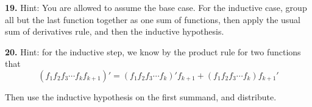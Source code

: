 \documentclass[10pt,]{book}
\theoremstyle{plain}
\theoremstyle{definition}
\theoremstyle{definition}
\theoremstyle{definition}
\numberwithin{equation}{chapter}
\begin{document}
\par\smallskip
\noindent\textbf{19.}\quad{}
Hint: You are allowed to assume the base case. For the inductive case, group all but the last function together as one sum of functions, then apply the usual sum of derivatives rule, and then the inductive hypothesis.
%
\par\smallskip
\noindent\textbf{20.}\quad{}
Hint: for the inductive step, we know by the product rule for two functions that
\begin{equation*}
  (f_1f_2f_3 \cdots f_k f_{k+1})' = (f_1f_2f_3\cdots f_k)'f_{k+1} + (f_1f_2f_3\cdots f_k)f_{k+1}'
\end{equation*}
%
\par

Then use the inductive hypothesis on the first summand, and distribute.
%
\par\smallskip
\end{document}
